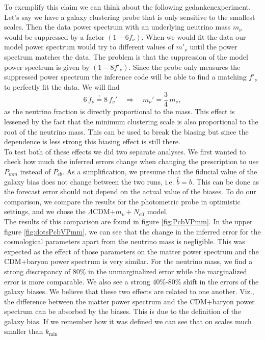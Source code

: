\documentclass[../main.tex]{subfiles}
\begin{document}
To exemplify this claim we can think about the following gedankenexperiment. Let's say we have a galaxy clustering probe that is only sensitive to the smallest scales. Then the data power spectrum with an underlying neutrino mass $m_\nu$ would be suppressed by a factor $(1-6f_\nu)$. When we would fit the data our model power spectrum would try to different values of $m'_\nu$ until the power spectrum matches the data. The problem is that the suppression of the model power spectrum is given by $(1-8f'_\nu)$. Since the probe only measures the suppressed power spectrum the inference code will be able to find a matching $f'_\nu$ to perfectly fit the data. We will find \begin{equation}
    6\,f_\nu \overset{!}{=} 8\,f_\nu' \quad\Longrightarrow\quad m_\nu' = \frac{3}{4}\, m_\nu,
\end{equation}
as the neutrino fraction is directly proportional to the mass. This effect is lessened by the fact that the minimum clustering scale is also proportional to the root of the neutrino mass. This can be used to break the biasing but since the dependence is less strong this biasing effect is still there.\\
To test both of these effects we did two separate analyses. We first wanted to check how much the inferred errors change when changing the prescription to use $P_{mm}$ instead of $P_{cb}$. As a simplification, we presume that the fiducial value of the galaxy bias does not change between the two runs, i.e. $\hat{b}=b$. This can be done as the forecast error should not depend on the actual value of the biases. To do our comparison, we compare the results for the photometric probe in optimistic settings, and we chose the $\Lambda$CDM+$m_\nu+N_\mathrm{eff}$ model.\\  
The results of this comparison are found in figure \ref{fig:PcbVPmm}. In the upper figure \ref{fig:dotsPcbVPmm}, we can see that the change in the inferred error for the cosmological parameters apart from the neutrino mass is negligible. This was expected as the effect of those parameters on the matter power spectrum and the CDM+baryon power spectrum is very similar. For the neutrino mass, we find a strong discrepancy of 80\% in the unmarginalized error while the marginalized error is more comparable. We also see a strong 40\%-80\% shift in the errors of the galaxy biases. We believe that these two effects are related to one another. Viz., the difference between the matter power spectrum and the CDM+baryon power spectrum can be absorbed by the biases. This is due to the definition of the galaxy bias. If we remember how it was defined we can see that on scales much smaller than $k_\mathrm{min}$
\end{document}
